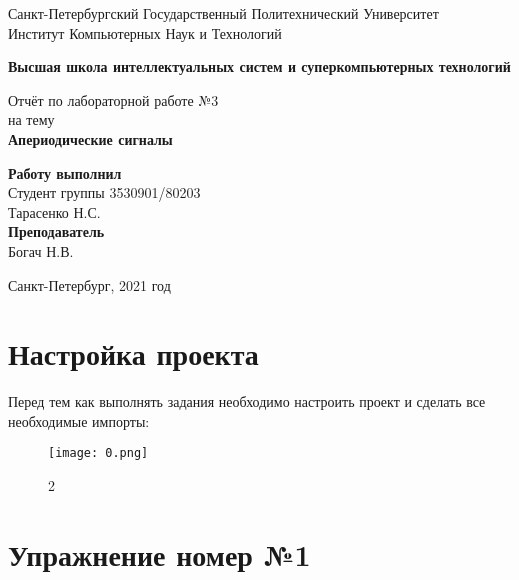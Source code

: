 \documentclass[10pt,a4paper,oneside]{article}
\begin{document}
\begin{titlepage}
\newpage
	\begin{center}
		\Large Санкт-Петербургский Государственный Политехнический Университет\\
		Институт Компьютерных Наук и Технологий\\
	\end{center}
	\begin{center}
		\large\textbf {Высшая школа интеллектуальных систем и суперкомпьютерных технологий}
	\end{center}
	
	\vspace{5em}
	\begin{center}
		\large{Отчёт по лабораторной работе №3 \\ на тему \\
		\textbf{Апериодические сигналы} }
	\end{center}
	
	\vspace{25em}
	\begin{flushright}
		\textbf{Работу выполнил\\}Студент группы 3530901/80203 \\ Тарасенко Н.С.\\
		\textbf{Преподаватель\\}Богач Н.В. 
	\end{flushright}
	
	\vspace{\fill}%
	\begin{center}
	Санкт-Петербург, 2021 год	
	\end{center}
\end{titlepage} %

\section{Настройка проекта}
Перед тем как выполнять задания необходимо настроить проект и сделать все необходимые импорты:

\begin{figure}[H]
        \centering
        \texttt{[image: 0.png]}
        \caption{2}
        \label{fig:first}
\end{figure}

\section{Упражнение номер №1}
\end{document}
